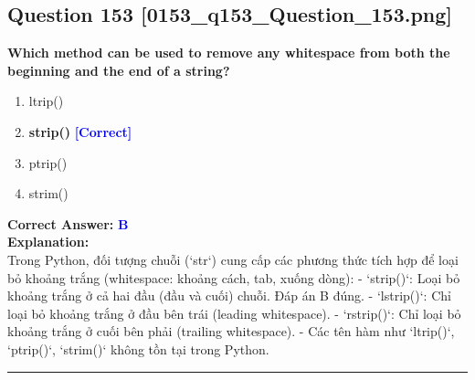 \documentclass[11pt,a4paper]{article}
\begin{document}
\begin{minipage}{\textwidth}
\subsection*{Question 153 \quad \footnotesize{[0153_q153_Question_153.png]}}
\noindent \textbf{Which method can be used to remove any whitespace from both the beginning and the end of a string?}

\begin{enumerate}[label=\Alph*.]
    \item ltrip()
    \item \textbf{strip()} \hfill \textcolor{blue}{\textbf{[Correct]}}
    \item ptrip()
    \item strim()
\end{enumerate}

\noindent \textbf{Correct Answer:} \textcolor{blue}{\textbf{B}} \\[4pt]
\noindent \textbf{Explanation:}\\
Trong Python, đối tượng chuỗi (`str`) cung cấp các phương thức tích hợp để loại bỏ khoảng trắng (whitespace: khoảng cách, tab, xuống dòng):\newline
- `strip()`: Loại bỏ khoảng trắng ở cả hai đầu (đầu và cuối) chuỗi. Đáp án B đúng.\newline
- `lstrip()`: Chỉ loại bỏ khoảng trắng ở đầu bên trái (leading whitespace).\newline
- `rstrip()`: Chỉ loại bỏ khoảng trắng ở cuối bên phải (trailing whitespace).\newline
- Các tên hàm như `ltrip()`, `ptrip()`, `strim()` không tồn tại trong Python.
\end{minipage}
\vspace{0.8cm}
\hrule
\vspace{0.5cm}
\end{document}
